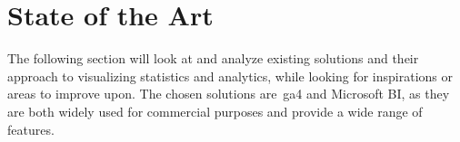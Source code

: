 \section{State of the Art}\label{sec:state-of-the-art}

The following section will look at and analyze existing solutions and their approach to visualizing statistics and
analytics, while looking for inspirations or areas to improve upon.
The chosen solutions are~\acrlong{ga4} and Microsoft BI, as they are both widely used for commercial purposes and
provide a wide range of features.


